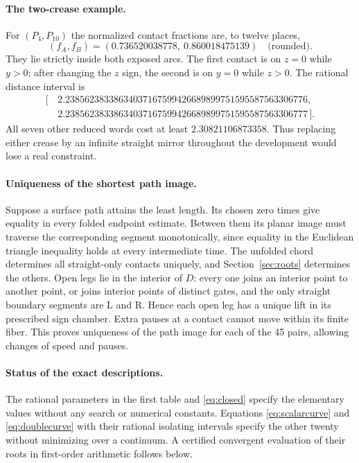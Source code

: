 \documentclass[10pt,letterpaper]{article}
\begin{document}
\paragraph{The two-crease example.}
For $(P_4,P_{10})$ the normalized contact fractions are, to twelve places,
\[
   (f_A,f_B)=(0.736520038778,\ 0.860018475139)\quad\text{(rounded)} .
\]
They lie strictly inside both exposed arcs. The first contact is on $z=0$ while $y>0$; after changing the $z$ sign, the second is on $y=0$ while $z>0$. The rational distance interval is
\[
\begin{aligned}
[\,&2.23856238338634037167599426689899751595587563306776,\\
   &2.23856238338634037167599426689899751595587563306777\,].
\end{aligned}
\]
All seven other reduced words cost at least $2.30821106873358$. Thus replacing either crease by an infinite straight mirror throughout the development would lose a real constraint.

\paragraph{Uniqueness of the shortest path image.}
Suppose a surface path attains the least length. Its chosen zero times give equality in every folded endpoint estimate. Between them its planar image must traverse the corresponding segment monotonically, since equality in the Euclidean triangle inequality holds at every intermediate time. The unfolded chord determines all straight-only contacts uniquely, and Section~\ref{sec:roots} determines the others. Open legs lie in the interior of $D$: every one joins an interior point to another point, or joins interior points of distinct gates, and the only straight boundary segments are L and R. Hence each open leg has a unique lift in its prescribed sign chamber. Extra pauses at a contact cannot move within its finite fiber. This proves uniqueness of the path image for each of the 45 pairs, allowing changes of speed and pauses.

\paragraph{Status of the exact descriptions.}
The rational parameters in the first table and \eqref{eq:closed} specify the elementary values without any search or numerical constants. Equations \eqref{eq:scalarcurve} and \eqref{eq:doublecurve} with their rational isolating intervals specify the other twenty without minimizing over a continuum. A certified convergent evaluation of their roots in first-order arithmetic follows below.
\end{document}
